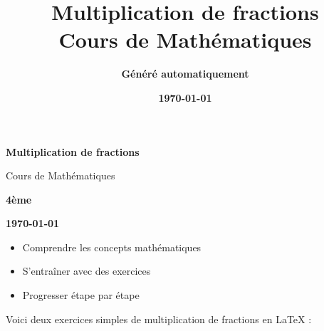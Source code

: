 \documentclass[12pt,a4paper]{article}
\title{\Huge\textcolor{primary}{\textbf{Multiplication de fractions}}\\[0.5cm]
\Large\textcolor{accent}{Cours de Mathématiques}}
\author{\Large\textcolor{secondary}{\textbf{Généré automatiquement}}}
\date{\Large\textcolor{warning}{\textbf{\today}}}
\begin{document}
\begin{titlepage}
\begin{center}
\vspace*{2cm}


\vspace{1cm}

{\Huge\textcolor{primary}{\textbf{Multiplication de fractions}}}

\vspace{0.5cm}

{\Large\textcolor{accent}{Cours de Mathématiques}}

\vspace{1cm}

{\Large\textcolor{secondary}{\textbf{4ème}}}

\vspace{0.5cm}

{\large\textcolor{warning}{\textbf{\today}}}

\vspace{2cm}

\begin{tcolorbox}[colback=lightgray,colframe=success,title=\textbf{\textcolor{success}{Objectifs du cours}}]
\begin{itemize}
\item Comprendre les concepts mathématiques
\item S'entraîner avec des exercices
\item Progresser étape par étape
\end{itemize}
\end{tcolorbox}

\end{center}
\end{titlepage}

\tableofcontents
\newpage

Voici deux exercices simples de multiplication de fractions en LaTeX :
\end{document}
